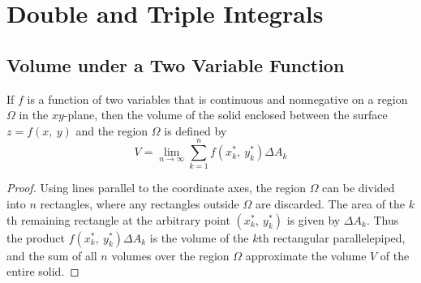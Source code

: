 \documentclass{article}
\begin{document}
\section{Double and Triple Integrals}
\subsection{Volume under a Two Variable Function}
\begin{definition}
    If $f$ is a function of two variables that is continuous and nonnegative
    on a region $\Omega$ in the $xy$-plane, then the volume of the solid
    enclosed between the surface $z=f(x,\: y)$ and the region $\Omega$ is
    defined by
    \begin{equation}\label{eq:volume_under_2d_function}
        V = \lim_{n \to \infty} \sum_{k = 1}^n f(x_k^\ast,\: y_k^\ast) \Delta A_k
    \end{equation}
\end{definition}
\begin{proof}
    Using lines parallel to the coordinate axes, the region $\Omega$ can be divided
    into $n$ rectangles, where any rectangles outside $\Omega$ are discarded.
    The area of the $k$th remaining rectangle at the arbitrary point $(x_k^\ast,\: y_k^\ast)$
    is given by $\Delta A_k$. Thus the product $f(x_k^\ast,\: y_k^\ast)\Delta A_k$ is the
    volume of the $k$th rectangular parallelepiped, and the sum of all $n$ volumes over
    the region $\Omega$ approximate the volume $V$ of the entire solid.
\end{proof}
\end{document}
